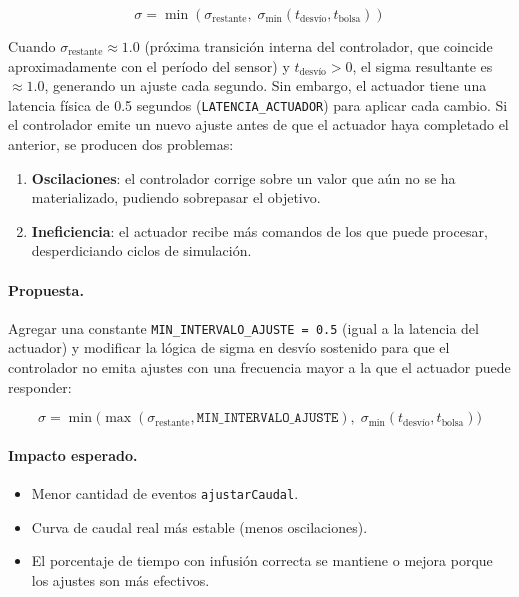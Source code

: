 \documentclass[12pt,a4paper]{article}
\begin{document}
\[
\sigma = \min(\sigma_{\text{restante}},\;
              \sigma_{\min}(t_{\text{desvío}}, t_{\text{bolsa}}))
\]

Cuando \(\sigma_{\text{restante}} \approx 1.0\) (próxima transición
interna del controlador, que coincide aproximadamente con el período
del sensor) y \(t_{\text{desvío}} > 0\), el sigma resultante es
\(\approx 1.0\), generando un ajuste cada segundo.  Sin embargo, el
actuador tiene una latencia física de 0.5 segundos
(\texttt{LATENCIA\_ACTUADOR}) para aplicar cada cambio.  Si el
controlador emite un nuevo ajuste antes de que el actuador haya
completado el anterior, se producen dos problemas:

\begin{enumerate}
    \item \textbf{Oscilaciones}: el controlador corrige sobre un valor
    que aún no se ha materializado, pudiendo sobrepasar el objetivo.
    \item \textbf{Ineficiencia}: el actuador recibe más comandos de
    los que puede procesar, desperdiciando ciclos de simulación.
\end{enumerate}

\paragraph{Propuesta.}  Agregar una constante
\texttt{MIN\_INTERVALO\_AJUSTE = 0.5} (igual a la latencia del
actuador) y modificar la lógica de sigma en desvío sostenido para
que el controlador no emita ajustes con una frecuencia mayor a la
que el actuador puede responder:

\[
\sigma = \min\bigl(\max(\sigma_{\text{restante}},
                        \texttt{MIN\_INTERVALO\_AJUSTE}),\;
                  \sigma_{\min}(t_{\text{desvío}}, t_{\text{bolsa}})\bigr)
\]

\paragraph{Impacto esperado.}
\begin{itemize}
    \item Menor cantidad de eventos \texttt{ajustarCaudal}.
    \item Curva de caudal real más estable (menos oscilaciones).
    \item El porcentaje de tiempo con infusión correcta se mantiene
    o mejora porque los ajustes son más efectivos.
\end{itemize}
\end{document}
